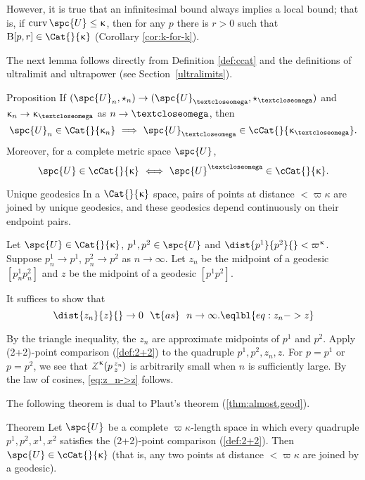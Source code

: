 However, it is true that an infinitesimal bound always implies a local bound; that is, if
$\curv\spc{U}\le\kappa$, then for any $p$ there is $r>0$ such that $\oBall[p,r]\in\Cat{}{\kappa}$ (Corollary \ref{cor:k-for-k}).


The next lemma follows directly from Definition \ref{def:ccat} and the definitions of ultralimit and ultrapower (see Section~\ref{ultralimits}).


\begin{thm}{Proposition}
\label{prop:CAT^omega}
If $(\spc{U}_n,\star_n)\to (\spc{U}_\o,\star_\o)$ and $\kappa_n\to\kappa_\o$ as $n\to\o$, then 
\[\spc{U}_n\in\Cat{}{\kappa_n}\  \Longrightarrow\  \spc{U}_\o\in\cCat{}{\kappa_\o}.\]
Moreover, for a complete metric space $\spc{U}$, 
\[\spc{U}\in\cCat{}{\kappa}\  
\Longleftrightarrow\  
\spc{U}^\o\in\cCat{}{\kappa}.\]

\end{thm} 

\begin{thm}{Unique geodesics}\label{lem:cat-unique} 
In a $\Cat{}{\kappa}$ space, pairs of points at distance $<\varpi\kappa$ are joined by unique geodesics, and these geodesics depend continuously on their endpoint pairs.
\end{thm}

Let $\spc{U} \in \Cat{}{\kappa}$, $p^1,p^2\in \spc{U}$ and $\dist{p^1}{p^2}{}<\varpi\kappa$.
Suppose $p^1_n\to p^1$, $p^2_n\to p^2$ as $n\to\infty$.
Let $z_n$ be the midpoint of a geodesic $[p^1_n p^2_n]$ and $z$ be the midpoint of a geodesic $[p^1p^2]$.  

It suffices to show that 
\[\dist{z_n}{z}{}\to0
\ \ \t{as}\ \ 
n\to\infty.
\eqlbl{eq:z_n->z}\]

By the triangle inequality, the $z_n$ are approximate midpoints of $p^1$ and $p^2$. 
Apply (2+2)-point comparison (\ref{def:2+2}) to the quadruple $p^1,p^2,z_n,z$. 
For $p=p^1$ or $p=p^2$, we see that $\angk{\kappa} {p}{z_n}{z}$ is arbitrarily small when $n$ is sufficiently large.  
By the law of cosines, \ref{eq:z_n->z} follows.
\qeds

The following theorem is dual to Plaut's theorem (\ref{thm:almost.geod}).

\begin{thm}{Theorem}\label{thm:cat-complete} 
Let $\spc{U}$ be a complete $\varpi\kappa$-length space in which every quadruple $p^1,p^2,x^1,x^2$ satisfies the (2+2)-point comparison (\ref{def:2+2}). Then $\spc{U}\in\cCat{}{\kappa}$ (that is, any two points at distance $<\varpi\kappa$ are joined by a geodesic).
\end{thm}

